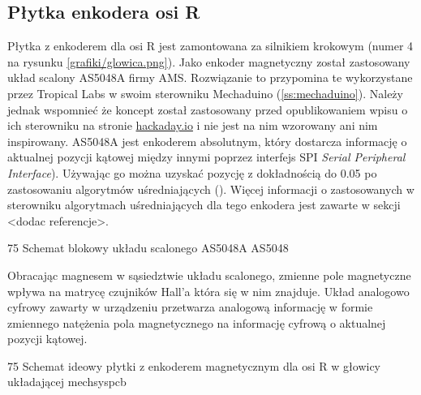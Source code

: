 \subsection{Płytka enkodera osi R}

Płytka z enkoderem dla osi R jest zamontowana za silnikiem krokowym (numer 4 na rysunku \ref{grafiki/glowica.png}). Jako enkoder magnetyczny został zastosowany układ scalony AS5048A firmy AMS. Rozwiązanie to przypomina te wykorzystane przez Tropical Labs w swoim sterowniku Mechaduino (\ref{ss:mechaduino}). Należy jednak wspomnieć że koncept został zastosowany przed opublikowaniem wpisu o ich sterowniku na stronie \url{hackaday.io} i nie jest na nim wzorowany ani nim inspirowany. AS5048A jest enkoderem absolutnym, który dostarcza informację o aktualnej pozycji kątowej między innymi poprzez interfejs SPI {\it Serial Peripheral Interface}). Używając go można uzyskać pozycję z dokładnością do 0.05\degree{} po zastosowaniu algorytmów uśredniających (\cite{AS5048}). Więcej informacji o zastosowanych w sterowniku algorytmach uśredniających dla tego enkodera jest zawarte w sekcji <dodac referencje>.

	{75}
	{Schemat blokowy układu scalonego AS5048A}
	{AS5048}
	
Obracając magnesem w sąsiedztwie układu scalonego, zmienne pole magnetyczne wpływa na matrycę czujników Hall'a która się w nim znajduje. Układ analogowo cyfrowy zawarty w urządzeniu przetwarza analogową informację w formie zmiennego natężenia pola magnetycznego na informację cyfrową o aktualnej pozycji kątowej.

	{75}
	{Schemat ideowy płytki z enkoderem magnetycznym dla osi R w głowicy układającej}
	{mechsyspcb}
	



\clearpage















